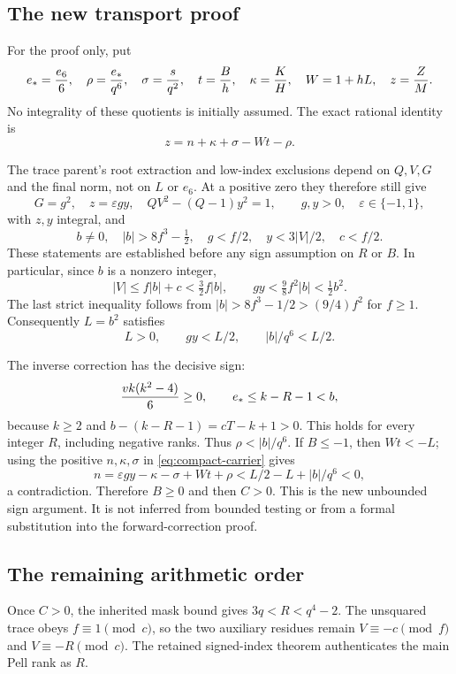 \subsection{The new transport proof}

For the proof only, put
\[
 e_*={e_6\over6},\quad \rho={e_*\over q^6},\quad
 \sigma={s\over q^2},\quad t={B\over h},\quad
 \kappa={K\over H},\quad W=1+hL,\quad z={Z\over M}.
\]
No integrality of these quotients is initially assumed.  The exact
rational identity is
\begin{equation}
 z=n+\kappa+\sigma-Wt-\rho.\label{eq:compact-carrier}
\end{equation}

The trace parent's root extraction and low-index exclusions depend on
$Q,V,G$ and the final norm, not on $L$ or $e_6$.
At a positive zero they therefore still give
\[
 G=g^2,\quad z=\varepsilon gy,\quad
 QV^2-(Q-1)y^2=1,\qquad g,y>0,\quad\varepsilon\in\{-1,1\},
\]
with $z,y$ integral, and
\[
 b\ne0,\quad |b|>8f^3-\tfrac12,\quad
 g<f/2,\quad y<3|V|/2,\quad c<f/2.
\]
These statements are established before any sign assumption on $R$ or $B$.
In particular, since $b$ is a nonzero integer,
\[
 |V|\le f|b|+c<\tfrac32 f|b|,
 \qquad
 gy<\tfrac98 f^2|b|<\tfrac12 b^2.
\]
The last strict inequality follows from
$|b|>8f^3-1/2>(9/4)f^2$ for $f\ge1$.
Consequently $L=b^2$ satisfies
\[
 L>0,\qquad gy<L/2,\qquad |b|/q^6<L/2.
\]

The inverse correction has the decisive sign:
\[
 {vk(k^2-4)\over6}\ge0,
 \qquad e_*\le k-R-1<b,
\]
because $k\ge2$ and $b-(k-R-1)=cT-k+1>0$.
This holds for every integer $R$, including negative ranks.  Thus
$\rho<|b|/q^6$.  If $B\le-1$, then $Wt<-L$; using the positive
$n,\kappa,\sigma$ in \eqref{eq:compact-carrier} gives
\[
 n=\varepsilon gy-\kappa-\sigma+Wt+\rho
   <L/2-L+|b|/q^6<0,
\]
a contradiction.  Therefore $B\ge0$ and then $C>0$.
This is the new unbounded sign argument.  It is not inferred from
bounded testing or from a formal substitution into the forward-correction
proof.

\subsection{The remaining arithmetic order}

Once $C>0$, the inherited mask bound gives $3q<R<q^4-2$.
The unsquared trace obeys $f\equiv1\pmod c$, so the two auxiliary
residues remain
$V\equiv-c\pmod f$ and $V\equiv-R\pmod c$.
The retained signed-index theorem authenticates the main Pell rank as $R$.


